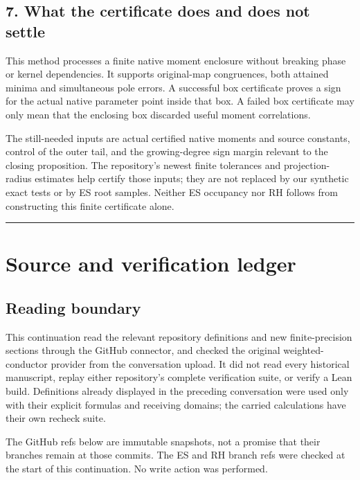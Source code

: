 \subsection{7. What the certificate does and does not
settle}\label{what-the-certificate-does-and-does-not-settle}

This method processes a finite native moment enclosure without breaking
phase or kernel dependencies. It supports original-map congruences, both
attained minima and simultaneous pole errors. A successful box
certificate proves a sign for the actual native parameter point inside
that box. A failed box certificate may only mean that the enclosing box
discarded useful moment correlations.

The still-needed inputs are actual certified native moments and source
constants, control of the outer tail, and the growing-degree sign margin
relevant to the closing proposition. The repository's newest finite
tolerances and projection-radius estimates help certify those inputs;
they are not replaced by our synthetic exact tests or by ES root
samples. Neither ES occupancy nor RH follows from constructing this
finite certificate alone.

\begin{center}\rule{0.5\linewidth}{0.5pt}\end{center}

\section{Source and verification
ledger}\label{source-and-verification-ledger}

\subsection{Reading boundary}\label{reading-boundary}

This continuation read the relevant repository definitions and new
finite-precision sections through the GitHub connector, and checked the
original weighted-conductor provider from the conversation upload. It
did not read every historical manuscript, replay either repository's
complete verification suite, or verify a Lean build. Definitions already
displayed in the preceding conversation were used only with their
explicit formulas and receiving domains; the carried calculations have
their own recheck suite.

The GitHub refs below are immutable snapshots, not a promise that their
branches remain at those commits. The ES and RH branch refs were checked
at the start of this continuation. No write action was performed.

